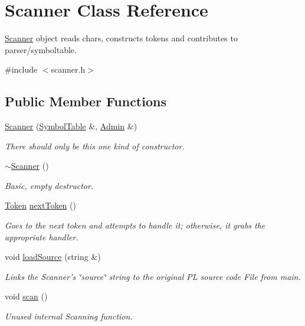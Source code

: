 \hypertarget{classScanner}{
\section{Scanner Class Reference}
\label{classScanner}
}


\hyperlink{classScanner}{Scanner} object reads chars, constructs tokens and contributes to parser/symboltable.  




{\ttfamily \#include $<$scanner.h$>$}

\subsection*{Public Member Functions}
\begin{DoxyCompactItemize}
\item 
\hyperlink{classScanner_afeff639ac96107cdd8f439a09ebceb1f}{Scanner} (\hyperlink{classSymbolTable}{SymbolTable} \&, \hyperlink{classAdmin}{Admin} \&)
\begin{DoxyCompactList}\small\item\em There should only be this one kind of constructor. \end{DoxyCompactList}\item 
\hyperlink{classScanner_a39f85e20f3ca942fd0a8e4bce88c27c7}{$\sim$Scanner} ()
\begin{DoxyCompactList}\small\item\em Basic, empty destructor. \end{DoxyCompactList}\item 
\hyperlink{classToken}{Token} \hyperlink{classScanner_ab43ce10667c1f695a396844449d3ab7d}{nextToken} ()
\begin{DoxyCompactList}\small\item\em Goes to the next token and attempts to handle it; otherwise, it grabs the appropriate handler. \end{DoxyCompactList}\item 
void \hyperlink{classScanner_a7fb5a6640567b85bd3b9dab76751dbb0}{loadSource} (string \&)
\begin{DoxyCompactList}\small\item\em Links the Scanner's \char`\"{}source\char`\"{} string to the original PL source code File from main. \end{DoxyCompactList}\item 
void \hyperlink{classScanner_a83df585ae4ba0622b9b6c107b0581a1c}{scan} ()
\begin{DoxyCompactList}\small\item\em Unused internal Scanning function. \end{DoxyCompactList}\item 

\end{DoxyCompactItemize}
